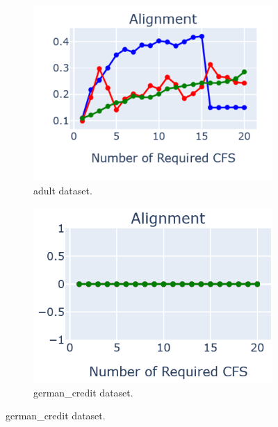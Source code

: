 \begin{figure}[!htbp]
  \centering
  \begin{subfigure}{0.45\textwidth}
    \centering
    \includegraphics[width=\textwidth]{images/alignment-adult-1.png}
    \caption{adult dataset.}
    \label{fig:image1}
  \end{subfigure}
  \hfill
  \begin{subfigure}{0.45\textwidth}
    \centering
    \includegraphics[width=\textwidth]{images/alignment-german_credit-1.png}
    \caption{german\_credit dataset.}
    \label{fig:image2}
  \end{subfigure}
  
  \vspace{0.5cm} 


\end{figure}
